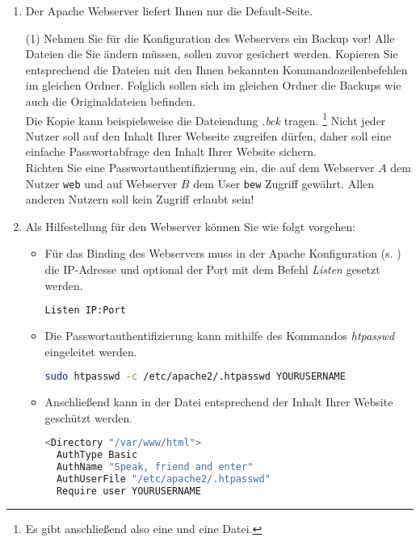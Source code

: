 \documentclass[paper=a4,fontsize=11pt]{scrartcl}%
\begin{document}
\begin{enumerate}
\begin{itemize}
\begin{lstlisting}[style=Bash, language=Bash]
sudo sysctl -w net.ipv4.ip_forward=1
\end{lstlisting}		
	\end{itemize}
	\item Der Apache Webserver liefert Ihnen nur die Default-Seite.
	\begin{tasks}(1)
		\task Nehmen Sie für die Konfiguration des Webservers ein Backup vor! Alle Dateien die Sie ändern müssen, sollen zuvor gesichert werden. Kopieren Sie entsprechend die Dateien mit den Ihnen bekannten Kommandozeilenbefehlen im gleichen Ordner. Folglich sollen sich im gleichen Ordner die Backups wie auch die Originaldateien befinden.\\
	Die Kopie kann beispielsweise die Dateiendung \emph{.bck} tragen. \footnote{Es gibt anschließend also eine  und eine  Datei.}	
		\task Nicht jeder Nutzer soll auf den Inhalt Ihrer Webseite zugreifen dürfen, daher soll eine einfache Passwortabfrage den Inhalt Ihrer Website sichern.\\
	Richten Sie eine Passwortauthentifizierung ein, die auf dem Webserver $A$ dem Nutzer \texttt{web} und auf Webserver $B$ dem User \texttt{bew} Zugriff gewährt. Allen anderen Nutzern soll kein Zugriff erlaubt sein!
	\end{tasks}
	\item Als Hilfestellung für den Webserver können Sie wie folgt vorgehen:
	\begin{itemize}
	\item Für das Binding des Webservers muss in der Apache Konfiguration (s. ) die IP-Adresse und optional der Port mit dem Befehl \emph{Listen} gesetzt werden. 
	\begin{lstlisting}[style=Bash, language=Bash]
Listen IP:Port 
\end{lstlisting} \label{apache}
	\item Die Passwortauthentifizierung kann mithilfe des Kommandos \emph{htpasswd} eingeleitet werden.
\begin{lstlisting}[style=Bash, language=Bash]
sudo htpasswd -c /etc/apache2/.htpasswd YOURUSERNAME
\end{lstlisting} \label{htpasswd}
	\item Anschließend kann in der Datei  entsprechend der Inhalt Ihrer Website geschützt werden.
\begin{lstlisting}[style=Bash, language=Bash]
<Directory "/var/www/html">
  AuthType Basic
  AuthName "Speak, friend and enter"
  AuthUserFile "/etc/apache2/.htpasswd"
  Require user YOURUSERNAME


\end{lstlisting}
\end{itemize}
\end{enumerate}
\end{document}
